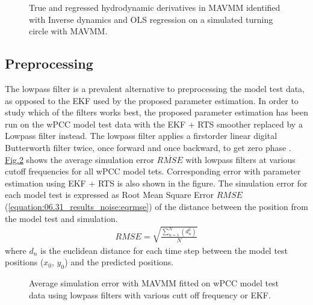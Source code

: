 \documentclass[review]{elsarticle}
\begin{document}
\begin{figure}[H]
\centering
\capstart

\noindent{}
\caption{True and regressed hydrodynamic derivatives in MAVMM identified with Inverse dynamics and OLS regression on a simulated turning circle with MAVMM.}\label{\detokenize{06.40_results_inverse_dynamics:fig-bar-parameters}}\end{figure}


\subsection{Preprocessing}
\label{\detokenize{06.31_results_noise:preprocessing}}\label{\detokenize{06.31_results_noise::doc}}
\sphinxAtStartPar
The low\sphinxhyphen{}pass filter is a prevalent alternative to preprocessing the model test data, as opposed to the EKF used by the proposed parameter estimation.
In order to study which of the filters works best, the proposed parameter estimation has been run on the wPCC model test data with the EKF + RTS smoother replaced by a Low\sphinxhyphen{}pass filter instead. The low\sphinxhyphen{}pass filter applies a first\sphinxhyphen{}order linear digital Butterworth filter twice, once forward and once backward, to get zero phase \cite{virtanen_scipy_2020}. \hyperref[\detokenize{06.31_results_noise:fig-lowpass-accuracy}]{Fig.\@ \ref{\detokenize{06.31_results_noise:fig-lowpass-accuracy}}} shows the average simulation error \( \overline{RMSE} \) with low\sphinxhyphen{}pass filters at various cut\sphinxhyphen{}off frequencies for all wPCC model tets. Corresponding error with parameter estimation using EKF + RTS is also shown in the figure. The simulation error for each model test is expressed as Root Mean Square Error \(RMSE\) (\autoref{equation:06.31_results_noise:eqrmse}) of the distance between the position from the model test and simulation.
\begin{equation}\label{equation:06.31_results_noise:eqrmse}
\begin{split}RMSE=\sqrt{ \frac{\sum_{n=1}^{N} (d_n^2) }{N}} \end{split}
\end{equation}
\sphinxAtStartPar
where \(d_n\) is the euclidean distance for each time step between the model test positions (\(x_0\), \(y_0\)) and the predicted positions.

\begin{figure}[H]
\centering
\capstart

\noindent{}
\caption{Average simulation error with MAVMM fitted on wPCC model test data using low\sphinxhyphen{}pass filters with various cutt off frequency or EKF.}\label{\detokenize{06.31_results_noise:fig-lowpass-accuracy}}\end{figure}
\end{document}
